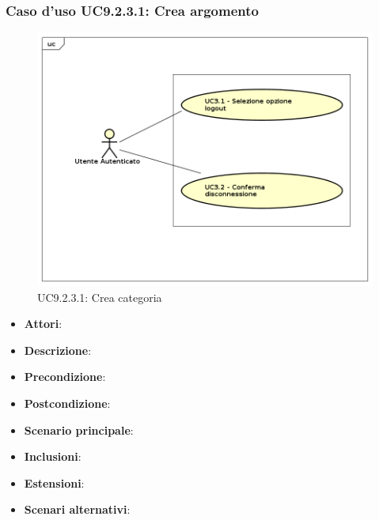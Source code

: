 			\subsubsection{Caso d'uso UC9.2.3.1: Crea argomento}
			\label{UC9.2.3.1}
			\begin{figure}[h]
				\centering
			\includegraphics[scale=0.7,keepaspectratio]{UML/UC9.png}
				\caption{UC9.2.3.1: Crea categoria}
			\end{figure}
			\FloatBarrier
			\begin{itemize}
				\item \textbf{Attori}: 
				\item \textbf{Descrizione}: 
				\item \textbf{Precondizione}: 
				\item \textbf{Postcondizione}: 
				\item \textbf{Scenario principale}:
				\item \textbf{Inclusioni}:
				\item \textbf{Estensioni}:
				\item \textbf{Scenari alternativi}:
			\end{itemize}
			
